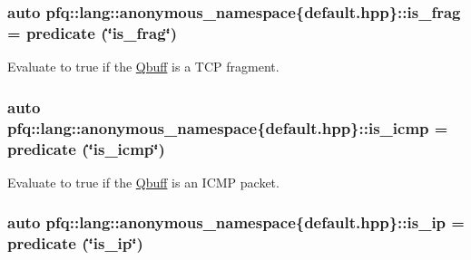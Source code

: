 \subsubsection[{\texorpdfstring{is\+\_\+frag}{is_frag}}]{\setlength{\rightskip}{0pt plus 5cm}auto pfq\+::lang\+::anonymous\+\_\+namespace\{default.\+hpp\}\+::is\+\_\+frag = {\bf predicate} (\char`\"{}is\+\_\+frag\char`\"{})}\hypertarget{namespacepfq_1_1lang_1_1anonymous__namespace_02default_8hpp_03_af042e092c925ae6306ae85ae5a56563d}{}\label{namespacepfq_1_1lang_1_1anonymous__namespace_02default_8hpp_03_af042e092c925ae6306ae85ae5a56563d}


Evaluate to {\ttfamily true} if the \hyperlink{structpfq_1_1lang_1_1Qbuff}{Qbuff} is a T\+CP fragment. 

\subsubsection[{\texorpdfstring{is\+\_\+icmp}{is_icmp}}]{\setlength{\rightskip}{0pt plus 5cm}auto pfq\+::lang\+::anonymous\+\_\+namespace\{default.\+hpp\}\+::is\+\_\+icmp = {\bf predicate} (\char`\"{}is\+\_\+icmp\char`\"{})}\hypertarget{namespacepfq_1_1lang_1_1anonymous__namespace_02default_8hpp_03_a01ccba89c8582ba423393226b54f12de}{}\label{namespacepfq_1_1lang_1_1anonymous__namespace_02default_8hpp_03_a01ccba89c8582ba423393226b54f12de}


Evaluate to {\ttfamily true} if the \hyperlink{structpfq_1_1lang_1_1Qbuff}{Qbuff} is an I\+C\+MP packet. 

\subsubsection[{\texorpdfstring{is\+\_\+ip}{is_ip}}]{\setlength{\rightskip}{0pt plus 5cm}auto pfq\+::lang\+::anonymous\+\_\+namespace\{default.\+hpp\}\+::is\+\_\+ip = {\bf predicate} (\char`\"{}is\+\_\+ip\char`\"{})}\hypertarget{namespacepfq_1_1lang_1_1anonymous__namespace_02default_8hpp_03_aa97a34e12e4c6bc2d85a5c169800cfa4}{}\label{namespacepfq_1_1lang_1_1anonymous__namespace_02default_8hpp_03_aa97a34e12e4c6bc2d85a5c169800cfa4}


